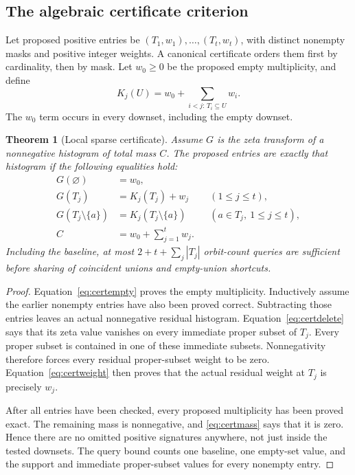 \documentclass[11pt,letterpaper]{article}
\newtheorem{theorem}{Theorem}[section]
\begin{document}
\subsection{The algebraic certificate criterion}
Let proposed positive entries be $(T_1,w_1),\ldots,(T_t,w_t)$, with distinct
nonempty masks and positive integer weights. A canonical certificate orders
them first by cardinality, then by mask. Let $w_0\geq0$ be the proposed empty
multiplicity, and define
\[
 K_j(U)=w_0+\sum_{i<j:\,T_i\subseteq U}w_i.
\]
The $w_0$ term occurs in every downset, including the empty downset.

\begin{theorem}[Local sparse certificate]
\label{thm:certificate}
Assume $G$ is the zeta transform of a nonnegative histogram of total mass $C$.
The proposed entries are exactly that histogram if the following equalities
hold:
\begin{align}
 G(\varnothing)&=w_0,\label{eq:certempty}\\
 G(T_j)&=K_j(T_j)+w_j &&(1\leq j\leq t),\label{eq:certweight}\\
 G(T_j\setminus\{a\})&=K_j(T_j\setminus\{a\})
 &&(a\in T_j,\ 1\leq j\leq t),\label{eq:certdelete}\\
 C&=w_0+\sum_{j=1}^t w_j.\label{eq:certmass}
\end{align}
Including the baseline, at most
$2+t+\sum_j|T_j|$ orbit-count queries are sufficient before sharing of
coincident unions and empty-union shortcuts.
\end{theorem}
\begin{proof}
Equation~\eqref{eq:certempty} proves the empty multiplicity. Inductively assume
the earlier nonempty entries have also been proved correct. Subtracting those
entries leaves an actual nonnegative residual histogram.
Equation~\eqref{eq:certdelete} says that its zeta value vanishes on every
immediate proper subset of $T_j$. Every proper subset is contained in one
of these immediate subsets. Nonnegativity therefore forces every residual
proper-subset weight to be zero. Equation~\eqref{eq:certweight} then proves
that the actual residual weight at $T_j$ is precisely $w_j$.

After all entries have been checked, every proposed multiplicity has been
proved exact. The remaining mass is nonnegative, and
\eqref{eq:certmass} says that it is zero. Hence there are no omitted positive
signatures anywhere, not just inside the tested downsets. The query bound
counts one baseline, one empty-set value, and the support and immediate
proper-subset values for every nonempty entry.
\end{proof}
\end{document}
